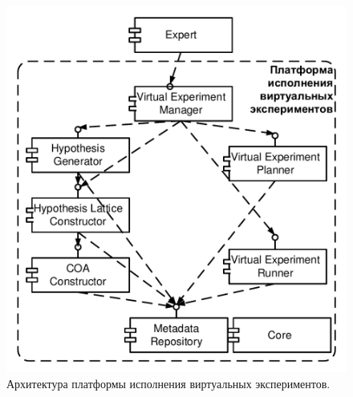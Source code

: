 \begin{figure}[h!]
    \centering
    \includegraphics[width=0.7\linewidth]{images/arch_v4.pdf}
    \caption{Архитектура платформы исполнения виртуальных экспериментов.}\label{fig:arch}
\end{figure}



